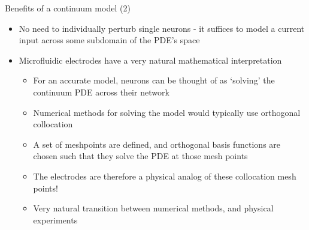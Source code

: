 \documentclass[presentation]{beamer}
\begin{document}
\begin{frame}[label={sec:org849ae19}]{Benefits of a continuum model (2)}
\begin{itemize}
\item No need to individually perturb single neurons - it suffices to model a current input across some subdomain of the PDE's space
\item Microfluidic electrodes have a very natural mathematical interpretation
\begin{itemize}
\item For an accurate model, neurons can be thought of as `solving' the continuum PDE across their network
\item Numerical methods for solving the model would typically use orthogonal collocation
\item A set of meshpoints are defined, and orthogonal basis functions are chosen such that they solve the PDE at those mesh points
\item The electrodes are therefore a physical analog of these collocation mesh points!
\item Very natural transition between numerical methods, and physical experiments
\end{itemize}
\end{itemize}
\end{frame}
\end{document}
